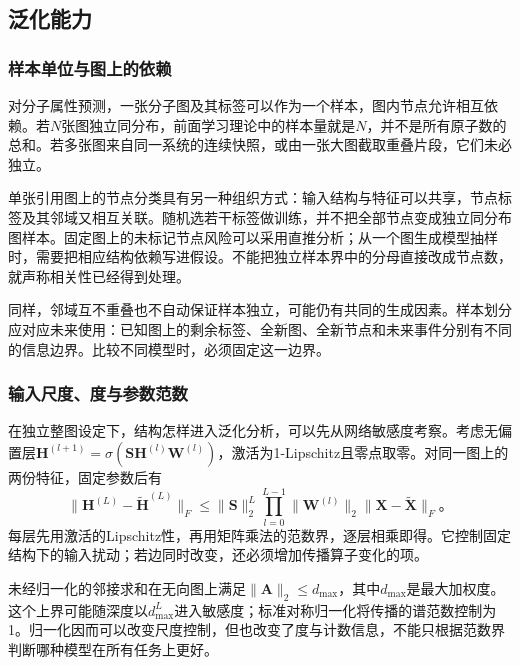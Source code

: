 \subsection{泛化能力}
\label{sec:gnn-generalization}

\subsubsection{样本单位与图上的依赖}
\label{sec:gnn-sample-units}

对分子属性预测，一张分子图及其标签可以作为一个样本，图内节点允许相互依赖。若$N$张图独立同分布，前面学习理论中的样本量就是$N$，并不是所有原子数的总和。若多张图来自同一系统的连续快照，或由一张大图截取重叠片段，它们未必独立。

单张引用图上的节点分类具有另一种组织方式：输入结构与特征可以共享，节点标签及其邻域又相互关联。随机选若干标签做训练，并不把全部节点变成独立同分布图样本。固定图上的未标记节点风险可以采用直推分析；从一个图生成模型抽样时，需要把相应结构依赖写进假设。不能把独立样本界中的分母直接改成节点数，就声称相关性已经得到处理。

同样，邻域互不重叠也不自动保证样本独立，可能仍有共同的生成因素。样本划分应对应未来使用：已知图上的剩余标签、全新图、全新节点和未来事件分别有不同的信息边界。比较不同模型时，必须固定这一边界。

\subsubsection{输入尺度、度与参数范数}
\label{sec:gnn-norm-generalization}

在独立整图设定下，结构怎样进入泛化分析，可以先从网络敏感度考察。考虑无偏置层$\bm{H}^{(l+1)}=\sigma(\bm{S}\bm{H}^{(l)}\bm{W}^{(l)})$，激活为1-Lipschitz且零点取零。对同一图上的两份特征，固定参数后有
\begin{equation}
  \lVert\bm{H}^{(L)}-\widetilde{\bm{H}}^{(L)}\rVert_F
    \leq\lVert\bm{S}\rVert_2^L
      \prod_{l=0}^{L-1}\lVert\bm{W}^{(l)}\rVert_2
      \lVert\bm{X}-\widetilde{\bm{X}}\rVert_F\text{。}
  \label{eq:gnn-feature-sensitivity}
\end{equation}
每层先用激活的Lipschitz性，再用矩阵乘法的范数界，逐层相乘即得。它控制固定结构下的输入扰动；若边同时改变，还必须增加传播算子变化的项。

未经归一化的邻接求和在无向图上满足$\lVert\bm{A}\rVert_2\leq d_{\max}$，其中$d_{\max}$是最大加权度。这个上界可能随深度以$d_{\max}^L$进入敏感度；标准对称归一化将传播的谱范数控制为1。归一化因而可以改变尺度控制，但也改变了度与计数信息，不能只根据范数界判断哪种模型在所有任务上更好。


